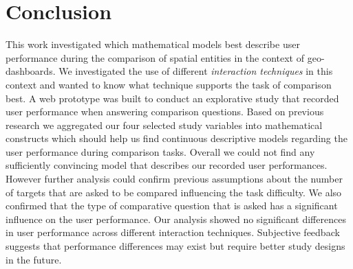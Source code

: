 \chapter{Conclusion}
This work investigated which mathematical models best describe user performance during the comparison of spatial entities in the context
of geo-dashboards. We investigated the use of different \textit{interaction techniques} in this context and wanted to know what technique
supports the task of comparison best. A web prototype was built to conduct an explorative study that recorded user performance when answering 
comparison questions. Based on previous research we aggregated our four selected study variables into mathematical constructs
which should help us find continuous descriptive models regarding the user performance during comparison tasks. Overall we could not find
any sufficiently convincing model that describes our recorded user performances. However further analysis could confirm previous assumptions
about the number of targets that are asked to be compared influencing the task difficulty. We also confirmed that the type of comparative
question that is asked has a significant influence on the user performance. Our analysis showed no significant differences in user performance
across different interaction techniques. Subjective feedback suggests that performance differences may exist but require better study designs in the
future.
